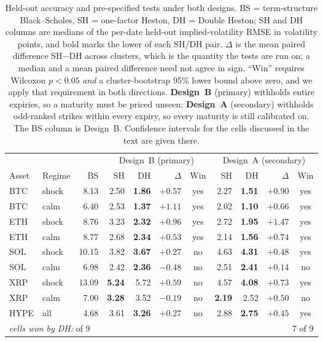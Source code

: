 \documentclass[runningheads]{llncs}
\begin{document}
\begin{table}[htbp]
\caption{Held-out accuracy and pre-specified tests under both designs.
BS = term-structure Black--Scholes, SH = one-factor Heston, DH = Double Heston;
SH and DH columns are medians of the per-date held-out implied-volatility RMSE
in volatility points, and bold marks the lower of each SH/DH pair. $\Delta$ is
the mean paired difference SH$-$DH across clusters, which is the quantity the
tests are run on; a median and a mean paired difference need not agree in sign.
``Win'' requires Wilcoxon $p<0.05$ \emph{and} a cluster-bootstrap 95\% lower
bound above zero, and we apply that requirement in both directions.
\textbf{Design~B} (primary) withholds entire expiries, so a maturity must be
priced unseen; \textbf{Design~A} (secondary) withholds odd-ranked strikes
within every expiry, so every maturity is still calibrated on. The BS column
is Design~B. Confidence intervals for the cells discussed in the text are
given there.}
\label{tab:results}
\centering
\setlength{\tabcolsep}{3.4pt}
\small
\begin{tabular}{llr rrrc rrrc}
\toprule
& & & \multicolumn{4}{c}{Design~B (primary)} & \multicolumn{4}{c}{Design~A (secondary)} \\
\cmidrule(lr){4-7}\cmidrule(lr){8-11}
Asset & Regime & BS & SH & DH & $\Delta$ & Win & SH & DH & $\Delta$ & Win \\
\midrule
BTC  & shock &  8.13 & 2.50 & \textbf{1.86} & $+0.57$ & yes & 2.27 & \textbf{1.51} & $+0.90$ & yes \\
BTC  & calm  &  6.40 & 2.53 & \textbf{1.37} & $+1.11$ & yes & 2.02 & \textbf{1.10} & $+0.66$ & yes \\
ETH  & shock &  8.76 & 3.23 & \textbf{2.32} & $+0.96$ & yes & 2.72 & \textbf{1.95} & $+1.47$ & yes \\
ETH  & calm  &  8.77 & 2.68 & \textbf{2.34} & $+0.53$ & yes & 2.14 & \textbf{1.56} & $+0.74$ & yes \\
SOL  & shock & 10.15 & 3.82 & \textbf{3.67} & $+0.27$ & no  & 4.63 & \textbf{4.31} & $+0.48$ & yes \\
SOL  & calm  &  6.98 & 2.42 & \textbf{2.36} & $-0.48$ & no  & 2.51 & \textbf{2.41} & $+0.14$ & no  \\
XRP  & shock & 13.09 & \textbf{5.24} & 5.72 & $+0.59$ & no  & 4.57 & \textbf{4.08} & $+0.73$ & yes \\
XRP  & calm  &  7.00 & \textbf{3.28} & 3.52 & $-0.19$ & no  & \textbf{2.19} & 2.52 & $+0.50$ & no  \\
HYPE & all   &  4.68 & 3.61 & \textbf{3.26} & $+0.27$ & no  & 2.88 & \textbf{2.75} & $+0.45$ & yes \\
\midrule
\multicolumn{7}{l}{\emph{cells won by DH:}\quad 4 of 9} & \multicolumn{4}{r}{7 of 9} \\
\bottomrule
\end{tabular}
\end{table}
\end{document}
